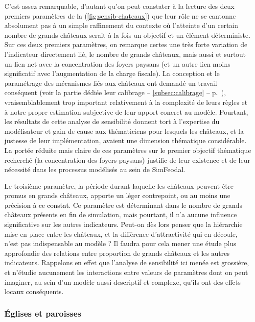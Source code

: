 C'est assez remarquable, d'autant qu'on peut constater à la lecture des deux premiers paramètres de la (\cref{fig:sensib-chateaux}) que leur rôle ne se cantonne absolument pas à un simple raffinement du contexte où l'atteinte d'un certain nombre de grands châteaux serait à la fois un objectif et un élément déterministe.
Sur ces deux premiers paramètres, on remarque certes une très forte variation de l'indicateur directement lié, le nombre de grands châteaux, mais aussi et surtout un lien net avec la concentration des foyers paysans (et un autre lien moins significatif avec l'augmentation de la charge fiscale).
La conception et le paramétrage des mécanismes liés aux châteaux ont demandé un travail conséquent (voir la partie dédiée leur calibrage -- \cref{subsec:calibrage} -- p.~\pageref{subsubsec:calibrage-chateaux}), vraisemblablement trop important relativement à la complexité de leurs règles et à notre propre estimation subjective de leur apport concret au modèle.
Pourtant, les résultats de cette analyse de sensibilité donnent tort à l'expertise du modélisateur et gain de cause aux thématiciens pour lesquels les châteaux, et la justesse de leur implémentation, avaient une dimension thématique considérable.
La portée réduite mais claire de ces paramètres sur le premier objectif thématique recherché (la concentration des foyers paysans) justifie de leur existence et de leur nécessité dans les processus modélisés au sein de SimFeodal.

Le troisième paramètre, la période durant laquelle les châteaux peuvent être promus en grands châteaux, apporte un léger contrepoint, ou au moins une précision à ce constat.
Ce paramètre est déterminant dans le nombre de grands châteaux présents en fin de simulation, mais pourtant, il n'a aucune influence significative sur les autres indicateurs.
Peut-on dès lors penser que la hiérarchie mise en place entre les châteaux, et la différence d'attractivité qui en découle, n'est pas indispensable au modèle ?
Il faudra pour cela mener une étude plus approfondie des relations entre proportion de grands châteaux et les autres indicateurs.
Rappelons en effet que l'analyse de sensibilité ici menée est grossière, et n'étudie aucunement les interactions entre valeurs de paramètres dont on peut imaginer, au sein d'un modèle aussi descriptif et complexe, qu'ils ont des effets locaux conséquents.

\subsubsection{Églises et paroisses}

